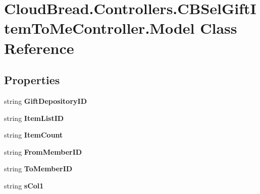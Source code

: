 \hypertarget{a00151}{}\section{Cloud\+Bread.\+Controllers.\+C\+B\+Sel\+Gift\+Item\+To\+Me\+Controller.\+Model Class Reference}
\label{a00151}
\subsection*{Properties}
\begin{DoxyCompactItemize}
\item 
string {\bfseries Gift\+Depository\+ID}\hypertarget{a00151_a2413c1358d7c1bf74e2164820b9be8ef}{}\label{a00151_a2413c1358d7c1bf74e2164820b9be8ef}

\item 
string {\bfseries Item\+List\+ID}\hypertarget{a00151_a25dcf0f1aa5ccf159032a147bd69c744}{}\label{a00151_a25dcf0f1aa5ccf159032a147bd69c744}

\item 
string {\bfseries Item\+Count}\hypertarget{a00151_a88fe3ba53e74f799bd49397a42f997c8}{}\label{a00151_a88fe3ba53e74f799bd49397a42f997c8}

\item 
string {\bfseries From\+Member\+ID}\hypertarget{a00151_a01b8b2a0cc41037154c82ca7912c1886}{}\label{a00151_a01b8b2a0cc41037154c82ca7912c1886}

\item 
string {\bfseries To\+Member\+ID}\hypertarget{a00151_aaf113d108b7cee339745a8767b073747}{}\label{a00151_aaf113d108b7cee339745a8767b073747}

\item 
string {\bfseries s\+Col1}\hypertarget{a00151_a9fc90e216b98077e271add35579ee658}{}\label{a00151_a9fc90e216b98077e271add35579ee658}


\end{DoxyCompactItemize}
